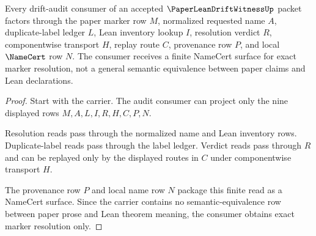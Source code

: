 \begin{theorem}
\label{thm:paper-lean-drift-witness-consumer-boundary}
Every drift-audit consumer of an accepted $\PaperLeanDriftWitnessUp$ packet factors through the paper marker row $M$, normalized requested name $A$, duplicate-label ledger $L$, Lean inventory lookup $I$, resolution verdict $R$, componentwise transport $H$, replay route $C$, provenance row $P$, and local $\NameCert$ row $N$. The consumer receives a finite NameCert surface for exact marker resolution, not a general semantic equivalence between paper claims and Lean declarations.
\end{theorem}
\begin{proof}
Start with the carrier. The audit consumer can project only the nine displayed rows $M,A,L,I,R,H,C,P,N$.

Resolution reads pass through the normalized name and Lean inventory rows. Duplicate-label reads pass through the label ledger. Verdict reads pass through $R$ and can be replayed only by the displayed routes in $C$ under componentwise transport $H$.

The provenance row $P$ and local name row $N$ package this finite read as a NameCert surface. Since the carrier contains no semantic-equivalence row between paper prose and Lean theorem meaning, the consumer obtains exact marker resolution only.
\end{proof}


